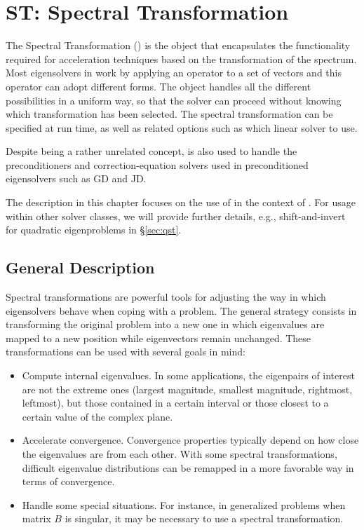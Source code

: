 \chapter{\label{cap:st}ST: Spectral Transformation}

\noindent The Spectral Transformation () is the object that encapsulates the functionality required for acceleration techniques based on the transformation of the spectrum. Most eigensolvers in  work by applying an operator to a set of vectors and this operator can adopt different forms. The  object handles all the different possibilities in a uniform way, so that the solver can proceed without knowing which transformation has been selected. The spectral transformation can be specified at run time, as well as related options such as which linear solver to use.

	Despite being a rather unrelated concept,  is also used to handle the preconditioners and correction-equation solvers used in preconditioned eigensolvers such as GD and JD.

	The description in this chapter focuses on the use of  in the context of . For usage within other solver classes, we will provide further details, e.g., shift-and-invert for quadratic eigenproblems in \S\ref{sec:qst}.

\section{General Description}

	Spectral transformations are powerful tools for adjusting the way in which eigensolvers behave when coping with a problem. The general strategy consists in transforming the original problem into a new one in which eigenvalues are mapped to a new position while eigenvectors remain unchanged. These transformations can be used with several goals in mind:
\begin{itemize}
\setlength{\itemsep}{-2pt}
\item Compute internal eigenvalues. In some applications, the eigenpairs of interest are not the extreme ones (largest magnitude, smallest magnitude, rightmost, leftmost), but those contained in a certain interval or those closest to a certain value of the complex plane.
\item Accelerate convergence. Convergence properties typically depend on how close the eigenvalues are from each other. With some spectral transformations, difficult eigenvalue distributions can be remapped in a more favorable way in terms of convergence. 
\item Handle some special situations. For instance, in generalized problems when matrix $B$ is singular, it may be necessary to use a spectral transformation.
\end{itemize}
	
